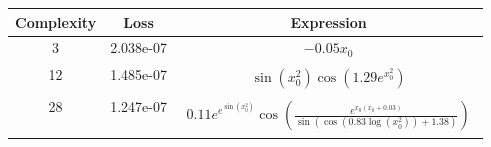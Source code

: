 \begin{center}
        \begin{tabular}{|c|c|c|}
        \hline
        Complexity & Loss & Expression \\
        \hline
        3 & 2.038e-07 & $\begin{aligned}- 0.05 x_{0}\end{aligned}$\\ \hline12 & 1.485e-07 & $\begin{aligned}\sin{\left(x_{0}^{2} \right)} \cos{\left(1.29 e^{x_{0}^{2}} \right)}\end{aligned}$\\ \hline28 & 1.247e-07 & $\begin{aligned}0.11 e^{e^{\sin{\left(x_{0}^{2} \right)}}} \cos{\left(\frac{e^{x_{0} \left(x_{0} + 0.03\right)}}{\sin{\left(\cos{\left(0.83 \log{\left(x_{0}^{2} \right)} \right)} + 1.38 \right)}} \right)}\end{aligned}$\\ \hline\end{tabular}
        \end{center}
        